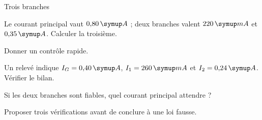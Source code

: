 \par\noindent\begin{minipage}{\linewidth}
\begin{exercice}[3]{Trois branches}
\begin{questions}
\item Le courant principal vaut $0{,}80\unite A$ ; deux branches valent $220\unite{mA}$ et $0{,}35\unite A$. Calculer la troisième.
\item Donner un contrôle rapide.
\end{questions}
\end{exercice}
\end{minipage}
\label{defi-ex-14}
\begin{questions}
\item Un relevé indique $I_G=0{,}40\unite A$, $I_1=260\unite{mA}$ et $I_2=0{,}24\unite A$. Vérifier le bilan.
\item Si les deux branches sont fiables, quel courant principal attendre ?
\item Proposer trois vérifications avant de conclure à une loi fausse.
\end{questions}
\pcGrille
